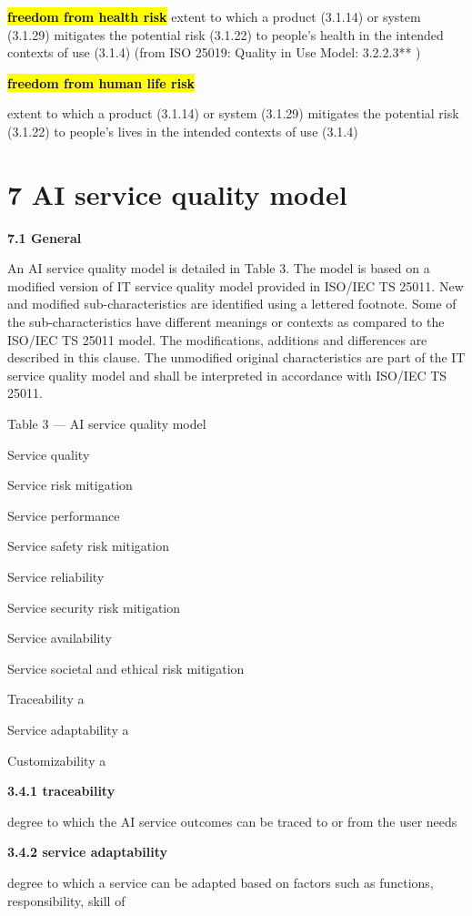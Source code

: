 \documentclass[
  letterpaper,
  DIV=11,
  numbers=noendperiod,
  oneside]{scrreprt}
\begin{document}
\begin{tcolorbox}
\textbf{\hl{freedom from health risk}} extent to which a product
(3.1.14) or system (3.1.29) mitigates the potential risk (3.1.22) to
people's health in the intended contexts of use (3.1.4) (from ISO 25019:
Quality in Use Model: 3.2.2.3** )

\textbf{\hl{freedom from human life risk}}

extent to which a product (3.1.14) or system (3.1.29) mitigates the
potential risk (3.1.22) to people's lives in the intended contexts of
use (3.1.4)

\section{7 AI service quality model}\label{ai-service-quality-model}

\textbf{7.1 General}

An AI service quality model is detailed in Table 3. The model is based
on a modified version of IT service quality model provided in ISO/IEC TS
25011. New and modified sub-characteristics are identified using a
lettered footnote. Some of the sub-characteristics have different
meanings or contexts as compared to the ISO/IEC TS 25011 model. The
modifications, additions and differences are described in this clause.
The unmodified original characteristics are part of the IT service
quality model and shall be interpreted in accordance with ISO/IEC TS
25011.

Table 3 --- AI service quality model

Service quality

Service risk mitigation

Service performance

Service safety risk mitigation

Service reliability

Service security risk mitigation

Service availability

Service societal and ethical risk mitigation

Traceability a

Service adaptability a

Customizability a

\textbf{3.4.1 traceability}

degree to which the AI service outcomes can be traced to or from the
user needs

\textbf{3.4.2 service adaptability}

degree to which a service can be adapted based on factors such as
functions, responsibility, skill of


\end{tcolorbox}
\end{document}
